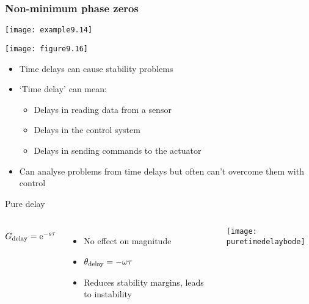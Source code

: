 \documentclass{beamer-control}
\begin{document}

\begin{frame}
\frametitle{Non-minimum phase zeros}
\texttt{[image: example9.14]}

\texttt{[image: figure9.16]}

\end{frame}


\begin{frame}
  \begin{itemize}
    \item  Time delays can cause stability problems
    \item  `Time delay' can mean:
    \begin{itemize}
      \item  Delays in reading data from a sensor
      \item  Delays in the control system
      \item  Delays in sending commands to the actuator
    \end{itemize}
    \item Can analyse problems from time delays but often can't overcome them with control
  \end{itemize}
\end{frame}

\begin{frame}{Pure delay}
\begin{columns}
  \[
    G_{\mathrm{delay}} = \mathrm{e}^{-s\tau}
  \]
\begin{itemize}
  \item No effect on magnitude
  \item $\theta_{\mathrm{delay}}=-\omega \tau$
  \item Reduces stability margins, leads to instability
\end{itemize}

    \texttt{[image: puretimedelaybode]}
\end{columns}
\end{frame}
\end{document}

